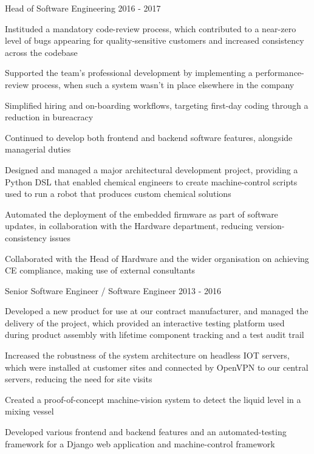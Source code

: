 \begin{cventries}
  \cventry
    {Head of Software Engineering} %
    {} %
    {} %
    {2016 - 2017} %
    {
      \begin{cvitems} %
        \item {Instituded a mandatory code-review process, which contributed to a near-zero level of bugs appearing for quality-sensitive customers and increased consistency across the codebase}
        \item {Supported the team's professional development by implementing a performance-review process, when such a system wasn't in place elsewhere in the company}
        \item {Simplified hiring and on-boarding workflows, targeting first-day coding through a reduction in bureacracy}
        \item {Continued to develop both frontend and backend software features, alongside managerial duties}
        \item {Designed and managed a major architectural development project, providing a Python DSL that enabled chemical engineers to create machine-control scripts used to run a robot that produces custom chemical solutions}
        \item {Automated the deployment of the embedded firmware as part of software updates, in collaboration with the Hardware department, reducing version-consistency issues}
        \item {Collaborated with the Head of Hardware and the wider organisation on achieving CE compliance, making use of external consultants}
      \end{cvitems}
    }

  \cventry
    {Senior Software Engineer / Software Engineer} %
    {} %
    {} %
    {2013 - 2016} %
    {
      \begin{cvitems} %
        \item {Developed a new product for use at our contract manufacturer, and managed the delivery of the project, which provided an interactive testing platform used during product assembly with lifetime component tracking and a test audit trail}
        \item {Increased the robustness of the system architecture on headless IOT servers, which were installed at customer sites and connected by OpenVPN to our central servers, reducing the need for site visits}
        \item {Created a proof-of-concept machine-vision system to detect the liquid level in a mixing vessel}
        \item {Developed various frontend and backend features and an automated-testing framework for a Django web application and machine-control framework}
      \end{cvitems}
    }


\end{cventries}
